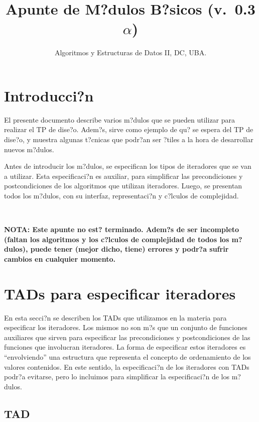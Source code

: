 \documentclass[a4paper,10pt]{article}
\title{Apunte de M?dulos B?sicos (v.\ 0.3$\alpha$)}
\author{Algoritmos y Estructuras de Datos II, DC, UBA.}
\date{\Cuatrimestre}
\begin{document}
\thispagestyle{empty}
\maketitle
\tableofcontents

\newpage

\section{Introducci?n}

El presente documento describe varios m?dulos que se pueden utilizar para realizar el TP de dise?o.  Adem?s, sirve como ejemplo de qu? se espera del TP de dise?o, y muestra algunas t?cnicas que podr?an ser ?tiles a la hora de desarrollar nuevos m?dulos.

Antes de introducir los m?dulos, se especifican los tipos de iteradores que se van a utilizar.  Esta especificaci?n es auxiliar, para simplificar las precondiciones y postcondiciones de los algoritmos que utilizan iteradores.  Luego, se presentan todos los m?dulos, con su interfaz, representaci?n y c?lculos de complejidad.

~

\noindent\textbf{NOTA: Este apunte no est? terminado.  Adem?s de ser incompleto (faltan los algoritmos y los c?lculos de complejidad de todos los m?dulos), puede tener (mejor dicho, tiene) errores y podr?a sufrir cambios en cualquier momento.}

\section{TADs para especificar iteradores}

En esta secci?n se describen los TADs que utilizamos en la materia para especificar los iteradores.  Los mismos no son m?s que un conjunto de funciones auxiliares que sirven para especificar las precondiciones y postcondiciones de las funciones que involucran iteradores.  La forma de especificar estos iteradores es ``envolviendo'' una estructura que representa el concepto de ordenamiento de los valores contenidos.  En este sentido, la especificaci?n de los iteradores con TADs podr?a evitarse, pero lo incluimos para simplificar la especificaci?n de los m?dulos. 

\subsection{TAD }
\end{document}
